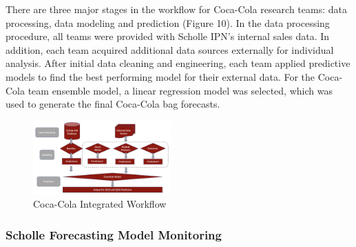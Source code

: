 \documentclass[12pt,oneside]{chicagocapstone}
\begin{document}
There are three major stages in the workflow for Coca-Cola research teams: data processing, data modeling and prediction (Figure 10). In the data processing procedure, all teams were provided with Scholle IPN's internal sales data. In addition, each team acquired additional data sources externally for individual analysis. After initial data cleaning and engineering, each team applied predictive models to find the best performing model for their external data. For the Coca-Cola team ensemble model, a linear regression model was selected, which was used to generate the final Coca-Cola bag forecasts.
\begin{figure}

{\centering \includegraphics[width=200px,angle = 0, scale=2.1]{figure/integrated_workflow} 

}

\caption{Coca-Cola Integrated Workflow}\label{fig:GoogleTrends3}
\end{figure}
\hypertarget{scholle-forecasting-model-monitoring}{%
\subsubsection*{Scholle Forecasting Model Monitoring}\label{scholle-forecasting-model-monitoring}}
\end{document}
